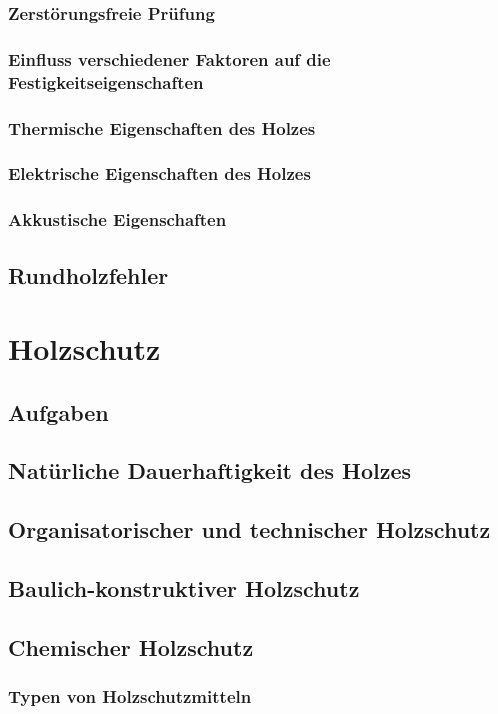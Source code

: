 \documentclass[12pt]{article}
\begin{document}
\subsubsection{Zerstörungsfreie Prüfung}
\subsubsection{Einfluss verschiedener Faktoren auf die Festigkeitseigenschaften}
\subsubsection{Thermische Eigenschaften des Holzes}
\subsubsection{Elektrische Eigenschaften des Holzes}
\subsubsection{Akkustische Eigenschaften}
\subsection{Rundholzfehler}
\section{Holzschutz}
\subsection{Aufgaben}
\subsection{Natürliche Dauerhaftigkeit des Holzes}
\subsection{Organisatorischer und technischer Holzschutz}
\subsection{Baulich-konstruktiver Holzschutz}
\subsection{Chemischer Holzschutz}
\subsubsection{Typen von Holzschutzmitteln}
\end{document}
